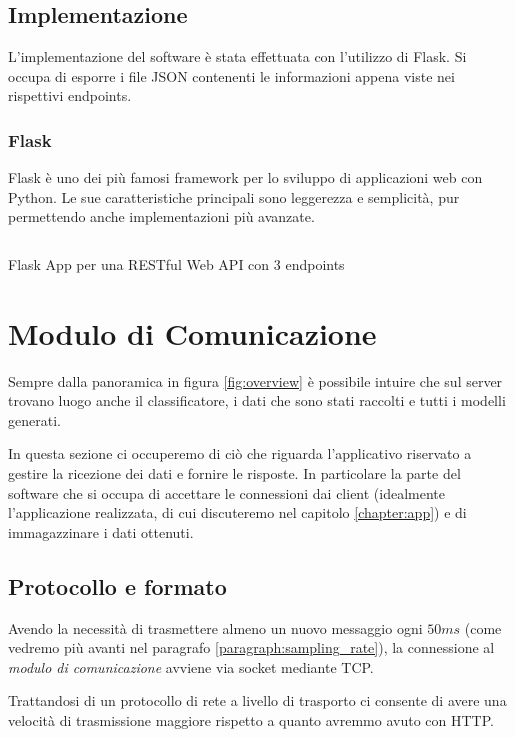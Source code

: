 \subsection{Implementazione}
L'implementazione del software è stata effettuata con l'utilizzo di Flask. Si occupa di esporre i 
file JSON contenenti le informazioni appena viste nei rispettivi endpoints.

\subsubsection{Flask}
Flask \cite{flask} è uno dei più famosi framework per lo sviluppo di applicazioni web 
con Python. Le sue caratteristiche principali sono leggerezza e semplicità, pur permettendo anche implementazioni 
più avanzate.


\begin{listing}[H] 
    \inputminted[frame=single,framesep=10pt]{python}{assets/snippets/server/api/flask.py}
    \caption{Flask App per una RESTful Web API con 3 endpoints}
\end{listing}



\section{Modulo di Comunicazione}
\label{section:receiver}
Sempre dalla panoramica in figura \ref{fig:overview} è possibile intuire che sul server 
trovano luogo anche il classificatore, i dati che sono stati raccolti e tutti i modelli generati. 

In questa sezione ci occuperemo di ciò che riguarda l'applicativo riservato a gestire la ricezione dei dati e fornire le risposte. 
In particolare la parte del software che si occupa di accettare le connessioni dai client (idealmente l'applicazione realizzata, di cui 
discuteremo nel capitolo \ref{chapter:app}) e di immagazzinare i dati ottenuti.

\subsection{Protocollo e formato}
Avendo la necessità di trasmettere almeno un nuovo messaggio ogni $50ms$ (come vedremo più avanti nel 
paragrafo \ref{paragraph:sampling_rate}), la connessione al \textit{modulo di comunicazione} avviene via socket mediante TCP. 

Trattandosi di un 
protocollo di rete a livello di trasporto ci consente di avere una velocità 
di trasmissione maggiore rispetto a quanto avremmo avuto con HTTP. 

